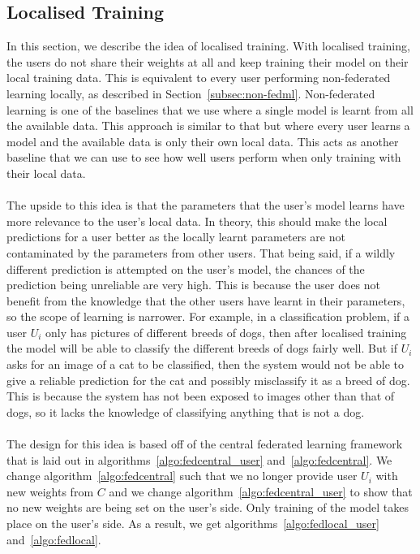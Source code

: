 \documentclass[12pt]{article}
\begin{document}
\subsection{Localised Training} %
In this section, we describe the idea of localised training. With localised training, the users do not share their weights at all and keep training their model on their local training data. This is equivalent to every user performing non-federated learning locally, as described in Section~\ref{subsec:non-fedml}. Non-federated learning is one of the baselines that we use where a single model is learnt from all the available data. This approach is similar to that but where every user learns a model and the available data is only their own local data. This acts as another baseline that we can use to see how well users perform when only training with their local data.
\\\\
The upside to this idea is that the parameters that the user's model learns have more relevance to the user's local data. In theory, this should make the local predictions for a user better as the locally learnt parameters are not contaminated by the parameters from other users. That being said, if a wildly different prediction is attempted on the user's model, the chances of the prediction being unreliable are very high. This is because the user does not benefit from the knowledge that the other users have learnt in their parameters, so the scope of learning is narrower. For example, in a classification problem, if a user $U_i$ only has pictures of different breeds of dogs, then after localised training the model will be able to classify the different breeds of dogs fairly well. But if $U_i$ asks for an image of a cat to be classified, then the system would not be able to give a reliable prediction for the cat and possibly misclassify it as a breed of dog. This is because the system has not been exposed to images other than that of dogs, so it lacks the knowledge of classifying anything that is not a dog.
\\\\
The design for this idea is based off of the central federated learning framework that is laid out in algorithms~\ref{algo:fedcentral_user} and~\ref{algo:fedcentral}. We change algorithm~\ref{algo:fedcentral} such that we no longer provide user $U_i$ with new weights from $C$ and we change algorithm~\ref{algo:fedcentral_user} to show that no new weights are being set on the user's side. Only training of the model takes place on the user's side. As a result, we get algorithms~\ref{algo:fedlocal_user} and~\ref{algo:fedlocal}.
\end{document}
